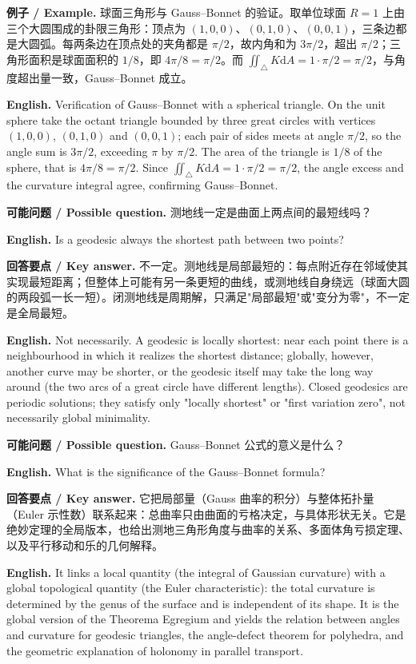 \documentclass[UTF8,11pt,a4paper]{ctexart}
\newcommand{\EN}[1]{\par\noindent \textbf{English.} #1\par}
\newcommand{\EX}[2]{\par\noindent \textbf{例子 / Example.} #1\par\EN{#2}}
\newcommand{\ASK}[4]{\par\noindent \textbf{可能问题 / Possible question.} #1\par\EN{#2}\noindent \textbf{回答要点 / Key answer.} #3\par\EN{#4}\medskip}
\newcommand{\dd}{\mathrm{d}}
\begin{document}
\EX{球面三角形与 Gauss--Bonnet 的验证。取单位球面 $R=1$ 上由三个大圆围成的卦限三角形：顶点为 $(1,0,0)$、$(0,1,0)$、$(0,0,1)$，三条边都是大圆弧。每两条边在顶点处的夹角都是 $\pi/2$，故内角和为 $3\pi/2$，超出 $\pi/2$；三角形面积是球面面积的 $1/8$，即 $4\pi/8=\pi/2$。而 $\iint_\triangle K\dd A=1\cdot\pi/2=\pi/2$，与角度超出量一致，Gauss--Bonnet 成立。}{Verification of Gauss--Bonnet with a spherical triangle. On the unit sphere take the octant triangle bounded by three great circles with vertices $(1,0,0)$, $(0,1,0)$ and $(0,0,1)$; each pair of sides meets at angle $\pi/2$, so the angle sum is $3\pi/2$, exceeding $\pi$ by $\pi/2$. The area of the triangle is $1/8$ of the sphere, that is $4\pi/8=\pi/2$. Since $\iint_\triangle K\dd A=1\cdot\pi/2=\pi/2$, the angle excess and the curvature integral agree, confirming Gauss--Bonnet.}
\ASK{测地线一定是曲面上两点间的最短线吗？}{Is a geodesic always the shortest path between two points?}{不一定。测地线是局部最短的：每点附近存在邻域使其实现最短距离；但整体上可能有另一条更短的曲线，或测地线自身绕远（球面大圆的两段弧一长一短）。闭测地线是周期解，只满足"局部最短"或"变分为零"，不一定是全局最短。}{Not necessarily. A geodesic is locally shortest: near each point there is a neighbourhood in which it realizes the shortest distance; globally, however, another curve may be shorter, or the geodesic itself may take the long way around (the two arcs of a great circle have different lengths). Closed geodesics are periodic solutions; they satisfy only "locally shortest" or "first variation zero", not necessarily global minimality.}
\ASK{Gauss--Bonnet 公式的意义是什么？}{What is the significance of the Gauss--Bonnet formula?}{它把局部量（Gauss 曲率的积分）与整体拓扑量（Euler 示性数）联系起来：总曲率只由曲面的亏格决定，与具体形状无关。它是绝妙定理的全局版本，也给出测地三角形角度与曲率的关系、多面体角亏损定理、以及平行移动和乐的几何解释。}{It links a local quantity (the integral of Gaussian curvature) with a global topological quantity (the Euler characteristic): the total curvature is determined by the genus of the surface and is independent of its shape. It is the global version of the Theorema Egregium and yields the relation between angles and curvature for geodesic triangles, the angle-defect theorem for polyhedra, and the geometric explanation of holonomy in parallel transport.}
\end{document}
